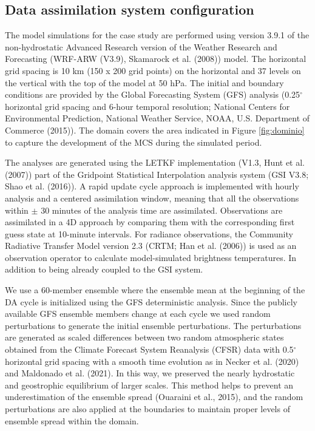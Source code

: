 \documentclass[final,5p,times,twocolumn,authoryear]{elsarticle} %
\begin{document}
\hypertarget{data-assimilation-system-configuration}{%
\subsection{Data assimilation system configuration}\label{data-assimilation-system-configuration}}

The model simulations for the case study are performed using version 3.9.1 of the non-hydrostatic Advanced Research version of the Weather Research and Forecasting (WRF-ARW (V3.9), Skamarock et al. (2008)) model.
The horizontal grid spacing is 10 km (150 x 200 grid points) on the horizontal and 37 levels on the vertical with the top of the model at 50 hPa.
The initial and boundary conditions are provided by the Global Forecasting System (GFS) analysis (0.25\(^{\circ}\) horizontal grid spacing and 6-hour temporal resolution; National Centers for Environmental Prediction, National Weather Service, NOAA, U.S. Department of Commerce (2015)).
The domain covers the area indicated in Figure \ref{fig:dominio} to capture the development of the MCS during the simulated period.

The analyses are generated using the LETKF implementation (V1.3, Hunt et al. (2007)) part of the Gridpoint Statistical Interpolation analysis system (GSI V3.8; Shao et al. (2016)).
A rapid update cycle approach is implemented with hourly analysis and a centered assimilation window, meaning that all the observations within \(\pm\) 30 minutes of the analysis time are assimilated.
Observations are assimilated in a 4D approach by comparing them with the corresponding first guess state at 10-minute intervals.
For radiance observations, the Community Radiative Transfer Model version 2.3 (CRTM; Han et al. (2006)) is used as an observation operator to calculate model-simulated brightness temperatures. In addition to being already coupled to the GSI system.

We use a 60-member ensemble where the ensemble mean at the beginning of the DA cycle is initialized using the GFS deterministic analysis. Since the publicly available GFS ensemble members change at each cycle we used random perturbations to generate the initial ensemble perturbations. The perturbations are generated as scaled differences between two random atmospheric states obtained from the Climate Forecast System Reanalysis (CFSR) data with 0.5\(^{\circ}\) horizontal grid spacing with a smooth time evolution as in Necker et al. (2020) and Maldonado et al. (2021). In this way, we preserved the nearly hydrostatic and geostrophic equilibrium of larger scales. This method helps to prevent an underestimation of the ensemble spread (Ouaraini et al., 2015), and the random perturbations are also applied at the boundaries to maintain proper levels of ensemble spread within the domain.
\end{document}
